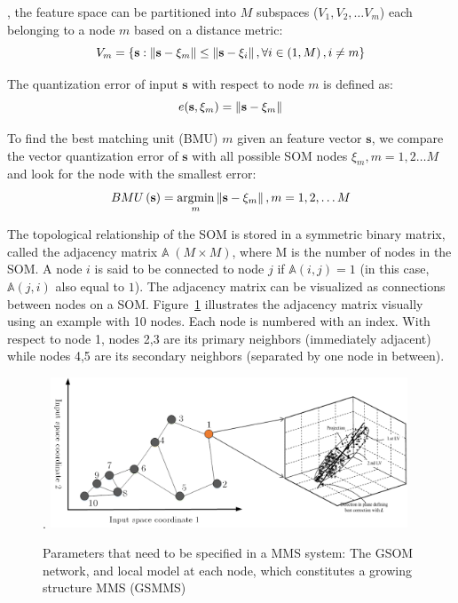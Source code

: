 \documentclass[review,3p]{elsarticle}
\renewcommand\[{\begin{equation}}
\renewcommand\]{\end{equation}}
\begin{document}
, the feature space can be partitioned into $M$ subspaces ($V_1, V_2, \ldots V_m$) each belonging to a node $m$ based on a distance metric:
\[{V_m} = \left\{ {{\bf{s}}:\left\| {{\bf{s}} - {{\bf{\xi }}_m}} \right\| \le \left\| {{\bf{s}} - {\xi _i}} \right\|,\forall i \in \left( {1,M} \right),i \ne m} \right\}\]

The quantization error of input $\mathbf s$ with respect to node $m$ is defined as:
\[
e(\mathbf s,\xi_m) = \left\| {{\bf{s}} - {\xi _m}} \right\|
\label{eqn:quantization_err}
\]

To find the best matching unit (BMU) $m$ given an feature vector $\mathbf s$, we compare the vector
quantization error of $\mathbf s$ with all possible SOM nodes $\xi_m, m = 1,2 \ldots M$ and look for the node with the smallest error:
\begin{equation}
BMU\left( {\bf{s}} \right) = \mathop {{\rm{argmin}}}\limits_m
\left\| {{\bf{s}} - {\xi _m}} \right\|,m = 1,2, \ldots M
\label{eqn:bmu}
\end{equation}

 The topological relationship of the SOM is stored in a symmetric binary
matrix, called the adjacency matrix $\mathbb A \;(M \times M)$, where M is
the number of nodes in the SOM. A node $i$ is said to be connected to node
$j$ if $\mathbb A(i,j) = 1$ (in this case, $\mathbb A(j,i)$ also equal to
$1$). The adjacency matrix can be visualized as connections between nodes on
a SOM. Figure~\ref{fig:gsmms_parameters} illustrates the adjacency matrix
visually using an example with 10 nodes. Each node is numbered with an index.
With respect to node 1, nodes 2,3 are its primary neighbors (immediately
adjacent) while nodes 4,5 are its secondary neighbors (separated by one node
in between).
\begin{figure}.
  \centering
  \includegraphics[width=0.95\textwidth]{figures/gsmms/gsmms_parameters.png}\\
  \caption{Parameters that need to be specified in a MMS system: The GSOM network, and local model at each node, which constitutes a growing structure MMS (GSMMS)}\label{fig:gsmms_parameters}
\end{figure}
\end{document}
